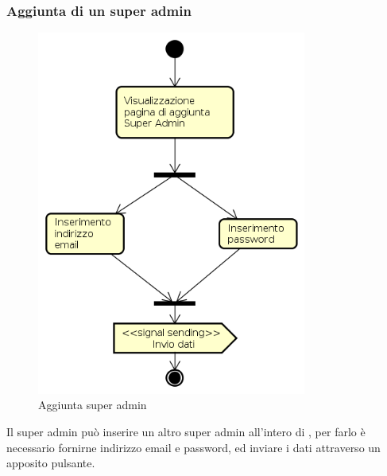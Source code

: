 \subsubsection{Aggiunta di un super admin}
\begin{figure}[H]
\begin{center}
\includegraphics[height=12cm]{res/sections/backend/activities/aggiuntaSuperAdmin.png}
\caption{Aggiunta super admin}
\end{center}
\end{figure}
Il super admin può inserire un altro super admin all'intero di , per farlo è necessario fornirne indirizzo email e password, ed inviare i dati attraverso un apposito pulsante.

